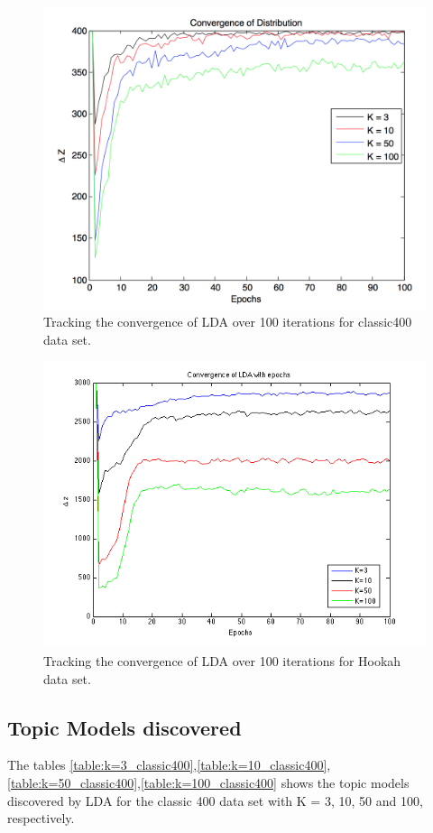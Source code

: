 \documentclass[11pt,a4paper,oneside]{article}
\begin{document}
\begin{figure}[H]
\centering
\includegraphics[width=\columnwidth]{classic400_convergence}
\caption{Tracking the convergence of LDA over 100 iterations for classic400 data set.}
\label{fig:classic400_convergence}
\end{figure}

\begin{figure}[H]
\centering
\includegraphics[width=\columnwidth]{hookah_convergence}
\caption{Tracking the convergence of LDA over 100 iterations for Hookah data set.}
\label{fig:hookah_convergence}
\end{figure}

\subsection{Topic Models discovered}
The tables \ref{table:k=3_classic400},\ref{table:k=10_classic400},\ref{table:k=50_classic400},\ref{table:k=100_classic400} shows the topic models discovered by LDA for the classic 400 data set with K = 3, 10, 50 and 100, respectively. 
\end{document}
